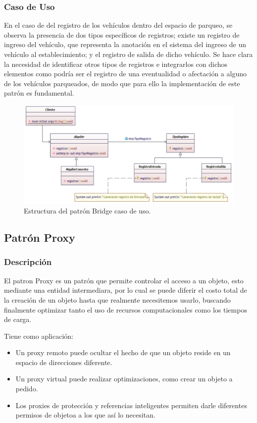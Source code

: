 \subsubsection{Caso de Uso}
En el caso de del registro de los vehículos dentro del espacio de parqueo, se observa la presencia de dos tipos específicos de registros; existe un registro de ingreso del vehículo, que representa la anotación en el sistema del ingreso de un vehículo al establecimiento; y el registro de salida de dicho vehículo.
Se hace clara la necesidad de identificar otros tipos de registros e integrarlos con dichos elementos como podría ser el registro de una eventualidad o afectación a alguno de los vehículos parqueados, de modo que para ello la implementación de este patrón es fundamental.

\begin{figure}[th!]
	\centering
	\includegraphics[width=.7\linewidth]{imagenes/Patrones/Bridge_caso.pdf}
	\caption{Estructura del patrón Bridge caso de uso.\cite{gof}}	
\end{figure}
\subsection{Patrón Proxy}

\subsubsection{Descripción}
El patron Proxy es un patrón que permite controlar el acceso a un objeto, esto  mediante una entidad intermediara, por lo cual se puede diferir el costo total de la creación de un objeto hasta que realmente necesitemos usarlo, buscando finalmente optimizar tanto el uso de recursos computacionales como los tiempos de carga.

Tiene como aplicación:

\begin{itemize}
	\item Un proxy remoto puede ocultar el hecho de que un objeto reside en un espacio de direcciones diferente.
	\item Un proxy virtual puede realizar optimizaciones, como crear un objeto a pedido.
	\item Los proxies de protección y referencias inteligentes permiten darle diferentes permisos de objetoa a los que así lo necesitan.
\end{itemize}

